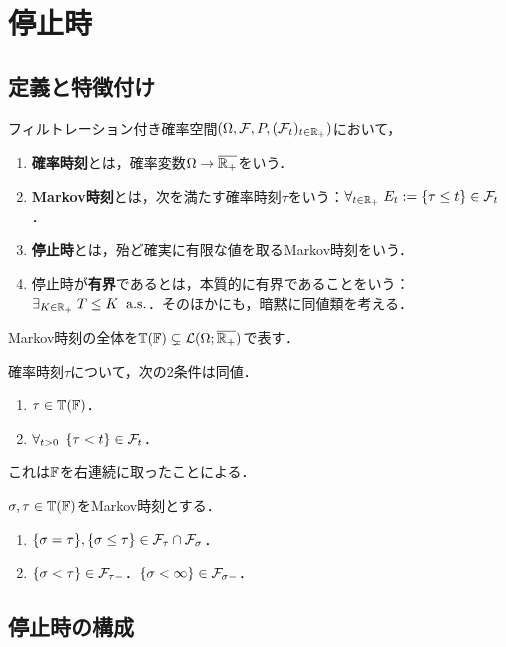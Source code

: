 \documentclass[uplatex,dvipdfmx]{jsreport}
\begin{document}
\section{停止時}

\subsection{定義と特徴付け}

\begin{definition}
    フィルトレーション付き確率空間$(\Omega,\mathcal{F},P,(\mathcal{F}_t)_{t\in\mathbb{R}_+})$において，
    \begin{enumerate}
        \item \textbf{確率時刻}とは，確率変数$\Omega\to\overline{\mathbb{R}_+}$をいう．
        \item \textbf{Markov時刻}とは，次を満たす確率時刻$\tau$をいう：$\forall_{t\in\mathbb{R}_+}\;E_t:=\left\{\tau\le t\right\}\in\mathcal{F}_t$．
        \item \textbf{停止時}とは，殆ど確実に有限な値を取るMarkov時刻をいう．
        \item 停止時が\textbf{有界}であるとは，本質的に有界であることをいう：$\exists_{K\in\mathbb{R}_+}\;T\le K\;\;\mathrm{a.s.}$．そのほかにも，暗黙に同値類を考える．
    \end{enumerate}
    Markov時刻の全体を$\mathbb{T}(\mathbb{F})\subsetneq\mathcal{L}(\Omega;\overline{\mathbb{R}_+})$で表す．
\end{definition}

\begin{lemma}
    確率時刻$\tau$について，次の2条件は同値．
    \begin{enumerate}
        \item $\tau\in\mathbb{T}(\mathbb{F})$．
        \item $\forall_{t>0}\;\left\{\tau<t\right\}\in\mathcal{F}_t$．
    \end{enumerate}
    これは$\mathbb{F}$を右連続に取ったことによる．
\end{lemma}

\begin{proposition}
    $\sigma,\tau\in\mathbb{T}(\mathbb{F})$をMarkov時刻とする．
    \begin{enumerate}
        \item $\{\sigma=\tau\},\{\sigma\le\tau\}\in\mathcal{F}_\tau\cap\mathcal{F}_\sigma$．
        \item $\left\{\sigma<\tau\right\}\in\mathcal{F}_{\tau-}$．$\left\{\sigma<\infty\right\}\in\mathcal{F}_{\sigma-}$．
    \end{enumerate}
\end{proposition}

\subsection{停止時の構成}
\end{document}
